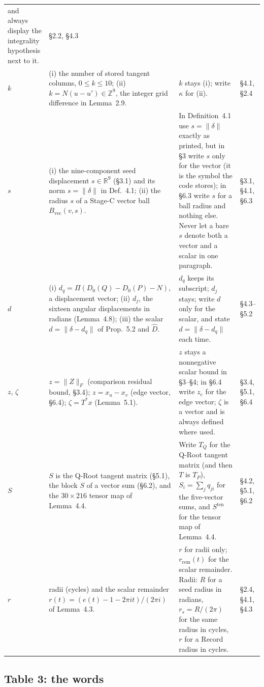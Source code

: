 \documentclass[11pt]{article}
\newcommand{\R}{\mathbb{R}}
\begin{document}
\begin{longtable}{@{}L{1.1cm}L{3.4cm}L{5.6cm}L{2.2cm}@{}}
and always display the integrality hypothesis next to it. &
\S2.2, \S4.3 \\
$k$ &
(i) the number of stored tangent columns, $0\le k\le10$;
(ii) $k=N(u-u')\in\mathbb{Z}^9$, the integer grid difference in Lemma~2.9. &
$k$ stays (i); write $\kappa$ for (ii). &
\S4.1, \S2.4 \\
$s$ &
(i) the nine-component seed displacement $s\in\R^9$ (\S3.1) and its norm $s=\|\delta\|$ in Def.~4.1;
(ii) the radius $s$ of a Stage-C vector ball $B_{\mathrm{vec}}(v,s)$. &
In Definition~4.1 use $s=\|\delta\|$ exactly as printed, but in \S3 write $s$ only for the vector
(it is the symbol the code stores); in \S6.3 write $s$ for a ball radius and nothing else. Never
let a bare $s$ denote both a vector and a scalar in one paragraph. &
\S3.1, \S4.1, \S6.3 \\
$d$ &
(i) $d_q=\Pi(D_0(Q)-D_0(P)-N)$, a displacement vector;
(ii) $d_j$, the sixteen angular displacements in radians (Lemma~4.8);
(iii) the scalar $d=\|\delta-d_q\|$ of Prop.~5.2 and $\hat D$. &
$d_q$ keeps its subscript; $d_j$ stays; write $d$ only for the scalar, and state
$d=\|\delta-d_q\|$ each time. &
\S4.3--\S5.2 \\
$z$, $\zeta$ &
$z=\|Z\|_F$ (comparison residual bound, \S3.4); $z=x_u-x_v$ (edge vector, \S6.4);
$\zeta=T^*x$ (Lemma~5.1). &
$z$ stays a nonnegative scalar bound in \S3--\S4; in \S6.4 write $z_e$ for the edge vector;
$\zeta$ is a vector and is always defined where used. &
\S3.4, \S5.1, \S6.4 \\
$S$ &
$S$ is the Q-Root tangent matrix (\S5.1), the block $S$ of a vector sum (\S6.2), and the $30\times216$
tensor map of Lemma~4.4. &
Write $T_Q$ for the Q-Root tangent matrix (and then $T$ is $T_P$), $S_i=\sum_j q_{ji}$ for the
five-vector sums, and $S^{\mathrm{ten}}$ for the tensor map of Lemma~4.4. &
\S4.2, \S5.1, \S6.2 \\
$r$ &
radii (cycles) and the scalar remainder $r(t)=(e(t)-1-2\pi it)/(2\pi i)$ of Lemma~4.3. &
$r$ for radii only; $r_{\mathrm{rem}}(t)$ for the scalar remainder. Radii: $R$ for a seed radius in
radians, $r_s=R/(2\pi)$ for the same radius in cycles, $r$ for a Record radius in cycles. &
\S2.4, \S4.1, \S4.3 \\
\hline
\end{longtable}

\subsection*{Table 3: the words}
\end{document}
